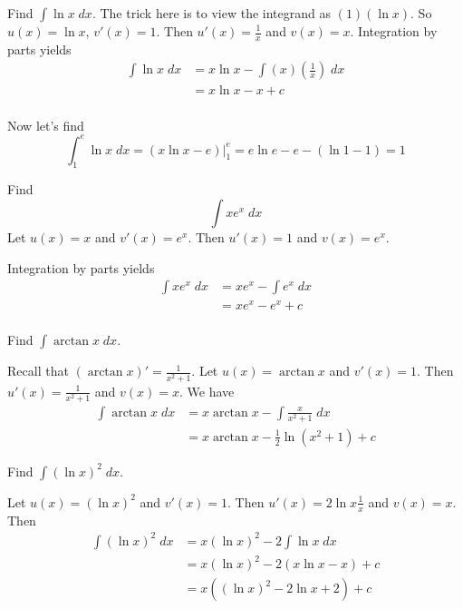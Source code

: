 \documentclass{article}
\begin{document}
  \begin{example}
    Find $\int \ln x \; dx$. The trick here is to view the integrand as $(1)(\ln x)$. So $u(x) = \ln x$, $v'(x) = 1$. Then $u'(x) = \frac{1}{x}$ and $v(x) = x$. Integration by parts yields
    \begin{align*}
      \int \ln x \; dx &= x \ln x - \int (x)\left(\frac{1}{x}\right) \; dx\\
      &= x \ln x - x + c\\
    \end{align*}

    Now let's find \[
      \int_1^e \ln x \; dx = (x \ln x - e)\Big|_1^e = e \ln e - e - (\ln 1 - 1) = 1
    \]
  \end{example}
  \begin{example}
    Find \[
      \int xe^x \; dx
    \]
    Let $u(x) = x$ and $v'(x) = e^x$. Then $u'(x) = 1$ and $v(x) = e^x$.

    Integration by parts yields
    \begin{align*}
      \int xe^x \; dx &= xe^x - \int e^x \; dx\\
      &= xe^x - e^x + c\\
    \end{align*}
  \end{example}
  \begin{example}
    Find $\int \arctan x \; dx$.

    Recall that $(\arctan x)' = \frac{1}{x^2 + 1}$. Let $u(x) = \arctan x$ and $v'(x) = 1$. Then $u'(x) = \frac{1}{x^2 + 1}$ and $v(x) = x$. We have
    \begin{align*}
      \int \arctan x \; dx &= x \arctan x - \int \frac{x}{x^2 + 1} \; dx\\
      &= x \arctan x - \frac{1}{2}\ln(x^2 + 1) + c
    \end{align*}
  \end{example}
  \begin{example}
    Find $\int (\ln x)^2 \; dx$.

    Let $u(x) = (\ln x)^2$ and $v'(x) = 1$. Then $u'(x) = 2\ln x \frac{1}{x}$ and $v(x) = x$.
    Then
    \begin{align*}
      \int (\ln x)^2 \; dx &= x(\ln x)^2 - 2\int \ln x \; dx\\
      &= x(\ln x)^2 - 2(x \ln x - x) + c\\
      &= x((\ln x)^2 - 2\ln x + 2) + c\\
    \end{align*}
  \end{example}
\end{document}
